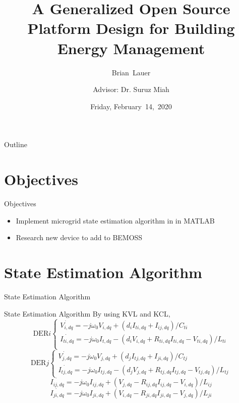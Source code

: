 \documentclass{beamer}
\title[]{A Generalized Open Source Platform Design for Building Energy Management}
\author[B.~Lauer]{Brian~Lauer\\\and
Advisor: Dr. Suruz Miah}
\institute[Bradley University] %
{
  Department of Electrical and Computer Engineering\\
  Bradley University\\
  1501 W. Bradley Avenue\\
  Peoria, IL, 61625, USA
}
\date[February~14,~2020]{Friday, February~14,~2020}
\begin{document}
\begin{frame}
  \titlepage
\end{frame}

\begin{frame}{Outline}
  \tableofcontents
\end{frame}

\section{Objectives}

\begin{frame}{Objectives}{}
\begin{itemize}
\item Implement microgrid state estimation algorithm in \cite{rana2018} in MATLAB
\item Research new device to add to BEMOSS
\end{itemize}
\end{frame}

\section{State Estimation Algorithm}
\begin{frame}{State Estimation Algorithm}{}
\end{frame}

\begin{frame}{State Estimation Algorithm}{}
By using KVL and KCL,
\[
\text{DER}i
\begin{cases}
\dot{V_{i,dq}}=-j \omega_0 V_{i,dq} + (d_i I_{ti,dq}+I_{ij,dq})/C_{ti}\\
\dot{I_{ti,dq}}=-j \omega_0 I_{t,dq} - (d_i V_{i,dq}+R_{ti,dq} I_{ti,dq} - V_{ti,dq})/L_{ti}\\
\end{cases}
\]
\[
\text{DER}j
\begin{cases}
\dot{V_{j,dq}}=-j \omega_0 V_{j,dq} + (d_j I_{tj,dq}+I_{ji,dq})/C_{tj}\\
\dot{I_{tj,dq}}=-j \omega_0 I_{tj,dq} -(d_j V_{j,dq} + R_{tj, dq} I_{tj,dq} - V_{tj,dq})/L_{tj}
\end{cases}
\]
\[
\dot{I_{ij,dq}}=-j \omega_0 I_{ij,dq} + (V_{j,dq} - R_{ij,dq} I_{ij,dq} - V_{i,dq})/L_{ij}
\]
\[
\dot{I_{ji,dq}}=-j \omega_0 I_{ji,dq} + (V_{i,dq} - R_{ji,dq} I_{ji,dq} - V_{j,dq})/L_{ji}
\]
\end{frame}
\end{document}
